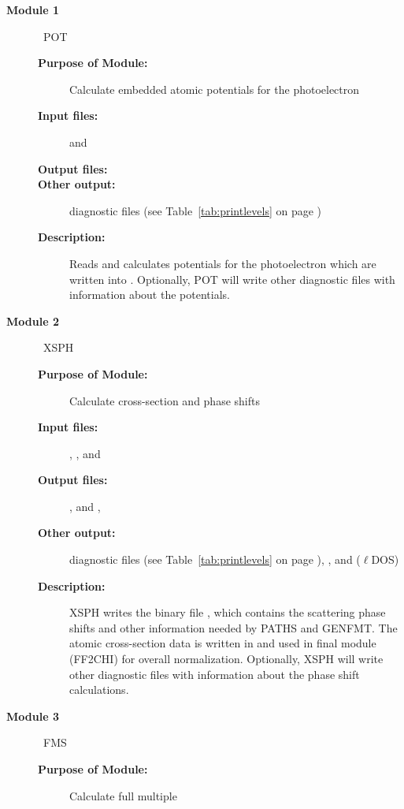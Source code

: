 \documentclass[11pt,oneside]{report} %
\begin{document}
\begin{description}
\begin{description}
  \end{description}
\item [\large\textbf{Module 1}]\dotfill\  {\large\textrm{POT}}
  \begin{description}
  \item[\textbf{Purpose of Module:}] Calculate embedded atomic
    potentials for the photoelectron
  \item[\textbf{Input files:}]  and 
  \item[\textbf{Output files:}] 
  \item[\textbf{Other output:}] diagnostic files (see
    Table~\ref{tab:printlevels} on page \pageref{tab:printlevels})
  \item[\textbf{Description:}] Reads  and calculates potentials
    for the photoelectron which are written into .
    Optionally, POT will write other diagnostic files with information
    about the potentials.
  \end{description}
\item [\large\textbf{Module 2}]\dotfill\  {\large\textrm{XSPH}}
  \begin{description}
  \item[\textbf{Purpose of Module:}] Calculate cross-section and phase
    shifts
  \item[\textbf{Input files:}] , ,
     and 
  \item[\textbf{Output files:}] , and ,
  \item[\textbf{Other output:}] diagnostic files (see
  Table~\ref{tab:printlevels} on page \pageref{tab:printlevels}),
    , and  ($\ell$DOS)
  \item[\textbf{Description:}]  XSPH writes the binary file
    , which contains the scattering phase shifts and
    other information needed by PATHS and GENFMT.  
    The  atomic  cross-section data is written in  and
     used in final module (FF2CHI) for overall normalization.
    Optionally, XSPH will write other diagnostic files with information
     about the phase shift calculations.
  \end{description}
\item [\large\textbf{Module 3}]\dotfill\  {\large\textrm{FMS}}
  \begin{description}
  \item[\textbf{Purpose of Module:}] Calculate full multiple

\end{description}
\end{description}
\end{document}
